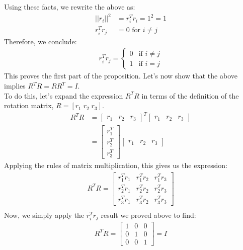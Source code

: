 \documentclass[oneside]{book}
\begin{document}
Using these facts, we rewrite the above as:
\begin{align}
    ||r_i||^2 &= r_i^Tr_i = 1^2 = 1\\
    r_i^Tr_j &= 0 \text{ for $i\neq j$ }
\end{align}
Therefore, we conclude:
\begin{align}
    r_i^Tr_j = \begin{cases}
        0 & \text{if } i \neq j\\
        1 & \text{if } i = j
    \end{cases}
\end{align}
This proves the first part of the proposition. Let's now show that the above implies $R^TR = RR^T = I$.\\
To do this, let's expand the expression $R^TR$ in terms of the definition of the rotation matrix, $R = [r_1 \; r_2 \; r_3]$.\\
\begin{align}
    R^TR &= \begin{bmatrix}
    r_1 & r_2 & r_3
    \end{bmatrix}^T
    \begin{bmatrix}
    r_1 & r_2 & r_3
    \end{bmatrix}\\
    &= \begin{bmatrix}
    r_1^T \\ r_2^T \\ r_3^T
    \end{bmatrix} \begin{bmatrix}
    r_1 & r_2 & r_3
    \end{bmatrix}
\end{align}
Applying the rules of matrix multiplication, this gives us the expression:
\begin{align}
    R^TR = \begin{bmatrix}
    r_1^Tr_1 & r_1^Tr_2 & r_1^Tr_3\\
    r_2^Tr_1 & r_2^Tr_2 & r_2^Tr_3\\
    r_3^Tr_1 & r_3^Tr_2 & r_3^Tr_3
    \end{bmatrix}\\
\end{align}
Now, we simply apply the $r_i^Tr_j$ result we proved above to find:
\begin{align}
    R^TR = \begin{bmatrix}
    1 & 0 & 0\\
    0 & 1 & 0\\
    0 & 0 & 1
    \end{bmatrix}
     = I
\end{align}
\end{document}
